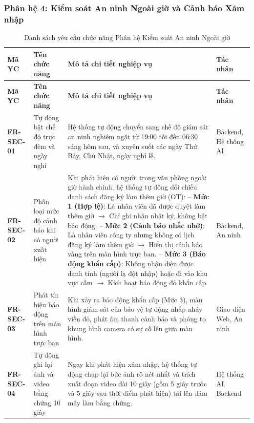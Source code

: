 \documentclass[12pt,a4paper]{article}
\begin{document}
\subsubsection{Phân hệ 4: Kiểm soát An ninh Ngoài giờ và Cảnh báo Xâm nhập}

\begin{longtable}{|C{\tabcolsep\relax}|L{\tabcolsep\relax}|L{\tabcolsep\relax}|C{\tabcolsep\relax}|}
\caption{Danh sách yêu cầu chức năng Phân hệ Kiểm soát An ninh Ngoài giờ}\\
\hline
{}
\textbf{Mã YC} & \textbf{Tên chức năng} & \textbf{Mô tả chi tiết nghiệp vụ} & \textbf{Tác nhân} \\
\hline
\endfirsthead
\hline
{}
\textbf{Mã YC} & \textbf{Tên chức năng} & \textbf{Mô tả chi tiết nghiệp vụ} & \textbf{Tác nhân} \\
\hline
\endhead
\textbf{FR-SEC-01} & Tự động bật chế độ trực đêm và ngày nghỉ & Hệ thống tự động chuyển sang chế độ giám sát an ninh nghiêm ngặt từ 19:00 tối đến 06:30 sáng hôm sau, và xuyên suốt các ngày Thứ Bảy, Chủ Nhật, ngày nghỉ lễ. & Backend, Hệ thống AI \\
\hline
{}
\textbf{FR-SEC-02} & Phân loại mức độ cảnh báo khi có người xuất hiện & Khi phát hiện có người trong văn phòng ngoài giờ hành chính, hệ thống tự động đối chiếu danh sách đăng ký làm thêm giờ (OT):\newline
-- \textbf{Mức 1 (Hợp lệ)}: Là nhân viên đã được duyệt làm thêm giờ $\rightarrow$ Chỉ ghi nhận nhật ký, không bật báo động.\newline
-- \textbf{Mức 2 (Cảnh báo nhắc nhở)}: Là nhân viên công ty nhưng không có lịch đăng ký làm thêm giờ $\rightarrow$ Hiển thị cảnh báo vàng trên màn hình trực ban.\newline
-- \textbf{Mức 3 (Báo động khẩn cấp)}: Không nhận diện được danh tính (người lạ đột nhập) hoặc đi vào khu vực cấm $\rightarrow$ Kích hoạt báo động đỏ khẩn cấp. & Backend, An ninh \\
\hline
\textbf{FR-SEC-03} & Phát tín hiệu báo động trên màn hình trực ban & Khi xảy ra báo động khẩn cấp (Mức 3), màn hình giám sát của bảo vệ tự động nhấp nháy viền đỏ, phát âm thanh cảnh báo và phóng to khung hình camera có sự cố lên giữa màn hình. & Giao diện Web, An ninh \\
\hline
{}
\textbf{FR-SEC-04} & Tự động ghi lại ảnh và video bằng chứng 10 giây & Ngay khi phát hiện xâm nhập, hệ thống tự động chụp lại bức ảnh rõ nét nhất và trích xuất đoạn video dài 10 giây (gồm 5 giây trước và 5 giây sau thời điểm phát hiện) tải lên đám mây làm bằng chứng. & Hệ thống AI, Backend \\

\end{longtable}
\end{document}
